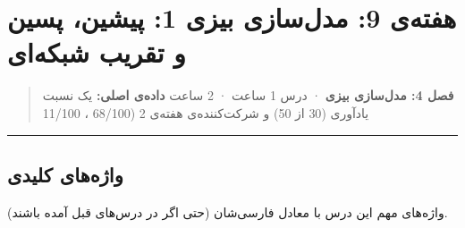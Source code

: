 \section{هفته‌ی 9: مدل‌سازی بیزی 1: پیشین، پسین و تقریب شبکه‌ای}

\begin{quote}
\textbf{فصل 4: مدل‌سازی بیزی} · درس 1 ساعت ·  2 ساعت
\textbf{داده‌ی اصلی:} یک نسبت یادآوری (30 از 50) و شرکت‌کننده‌ی 
هفته‌ی 2 (68/100 ، 11/100 
\end{quote}

\begin{center}\rule{0.5\linewidth}{0.5pt}\end{center}

\subsection{واژه‌های کلیدی}

واژه‌های مهم این درس با معادل فارسی‌شان (حتی اگر در درس‌های قبل آمده
باشند).

